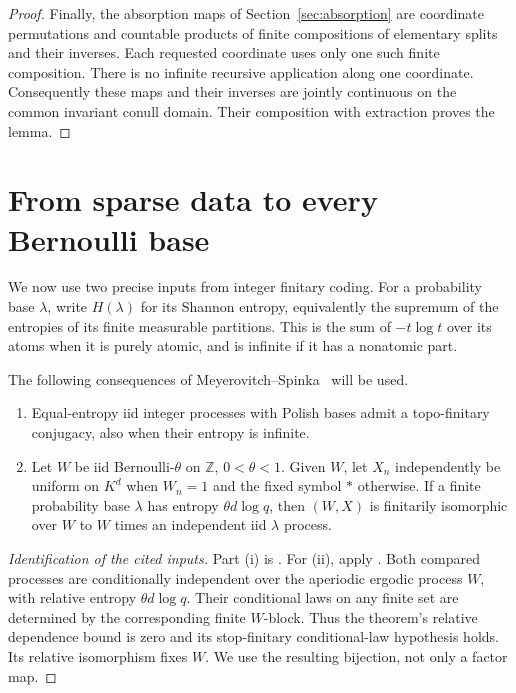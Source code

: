 \documentclass[11pt,a4paper]{article}
\numberwithin{equation}{section}
\begin{document}
\begin{proof}
Finally, the absorption maps of Section~\ref{sec:absorption} are
coordinate permutations and countable products of finite compositions
of elementary splits and their inverses. Each requested coordinate
uses only one such finite composition. There is no infinite recursive
application along one coordinate. Consequently these maps and their
inverses are jointly continuous on the common invariant conull
domain. Their composition with extraction proves the lemma.
\end{proof}

\section{From sparse data to every Bernoulli base}\label{sec:all-bases}

We now use two precise inputs from integer finitary coding.
For a probability base $\lambda$, write $H(\lambda)$ for its Shannon
entropy, equivalently the supremum of the entropies of its finite
measurable partitions. This is the sum of $-t\log t$ over its atoms
when it is purely atomic, and is infinite if it has a nonatomic part.

\begin{lemma}\label{lem:integer-coding}
The following consequences of Meyerovitch--Spinka~\cite{MS} will be used.
\begin{enumerate}[label=(\roman*)]
\item Equal-entropy iid integer processes with Polish bases admit a
topo-finitary conjugacy, also when their entropy is infinite.
\item Let $W$ be iid Bernoulli-$\theta$ on $\mathbb Z$, $0<\theta<1$.
Given $W$, let $X_n$ independently be uniform on $K^d$ when $W_n=1$
and the fixed symbol $*$ otherwise. If a finite probability base
$\lambda$ has entropy $\theta d\log q$, then $(W,X)$ is finitarily
isomorphic over $W$ to $W$ times an independent iid $\lambda$ process.
\end{enumerate}
\end{lemma}
\begin{proof}[Identification of the cited inputs]
Part (i) is \cite[Theorem 3.15]{MS}.
For (ii), apply \cite[Theorem 3.2]{MS}. Both compared processes are
conditionally independent over the aperiodic ergodic process $W$,
with relative entropy $\theta d\log q$. Their conditional laws on
any finite set are determined by the corresponding finite $W$-block.
Thus the theorem's relative dependence bound is zero and its
stop-finitary conditional-law hypothesis holds. Its relative
isomorphism fixes $W$. We use the resulting bijection, not only a
factor map.
\end{proof}
\end{document}
